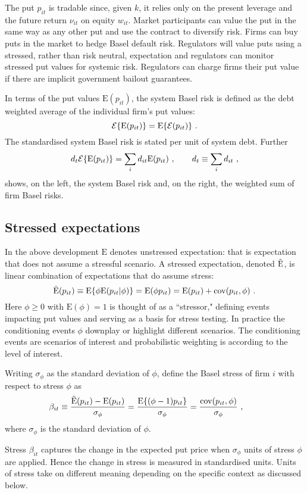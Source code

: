 \documentclass[authoryear]{elsarticle}
\newcommand{\E}{\mathrm{E}}
\newcommand{\cov}{\mathrm{cov}}
\newcommand{\Ex}{{\cal E}}
\newcommand{\cq}{\ , \qquad}
\newcommand{\be}[1]{\begin{equation}\label{#1}}
\newcommand{\ee}{\end{equation}}
\begin{document}
The put $p_{it}$ is tradable since, given $k$, it relies only on the present leverage and the future return $\nu_{it}$ on equity $w_{it}$.  Market participants can value the put in  the same way as any other put and use the contract to diversify risk.  Firms can buy puts in the market to hedge Basel default risk.    Regulators will value puts using a stressed, rather than risk neutral, expectation and regulators can monitor stressed put values for systemic risk. Regulators can charge firms their put value if there are implicit government bailout guarantees.

In terms of the put values $\E(p_{it})$, the  system Basel risk is defined as the debt weighted average of the individual firm's put values:
\be{nsrisk}
\Ex\{\E(p_{it})\} = \E\{\Ex(p_{it})\}  \ . 
\ee
The standardised system Basel risk is stated per unit of system debt.  Further
$$
d_t\Ex\{\E(p_{it})\}  = \sum_id_{it}\E(p_{it}) \cq d_t\equiv\sum_id_{it}\ ,
$$
shows, on the left, the system Basel risk and, on the right, the weighted sum of firm Basel risks.  

\subsection{Stressed expectations}

In the above development $\E$  denotes  unstressed expectation:  that is expectation that does not assume a stressful scenario.   A stressed expectation, denoted $\Es$, is 
linear combination of  expectations that do assume stress:
\be{formula}
\Es(p_{it}) \equiv \E\{\phi\E(p_{it}|\phi)\} = \E(\phi p_{it}) = \E(p_{it}) + \cov(p_{it},\phi)\ .
\ee
Here $\phi\ge 0$ with $\E(\phi)=1$ is thought of as a ``stressor,"  defining events impacting put values and serving as a basis for stress testing.  In practice the conditioning events $\phi$  downplay or highlight different scenarios.  The conditioning events are scenarios of interest and  probabilistic weighting is according to the level of interest.


Writing  $\sigma_{\phi}$ as the standard deviation of $\phi$,  define the Basel stress of firm $i$ with respect to stress $\phi$ as
\be{zscore}
\beta_{it}\equiv \frac{\Es(p_{it})- \E(p_{it})}{\sigma_\phi}= \frac{\E\{(\phi-1)p_{it}\}}{\sigma_\phi}= \frac{\cov(p_{it},\phi)}{\sigma_\phi} \cq
\ee
where  $\sigma_\phi$ is the standard deviation of $\phi$. 

Stress $\beta_{it}$ captures the change in the expected put price  when $\sigma_\phi$ units of stress $\phi$ are applied. Hence the change in stress is measured in standardised units.  Units of stress take on different meaning depending on the specific context as discussed below.  
\end{document}
